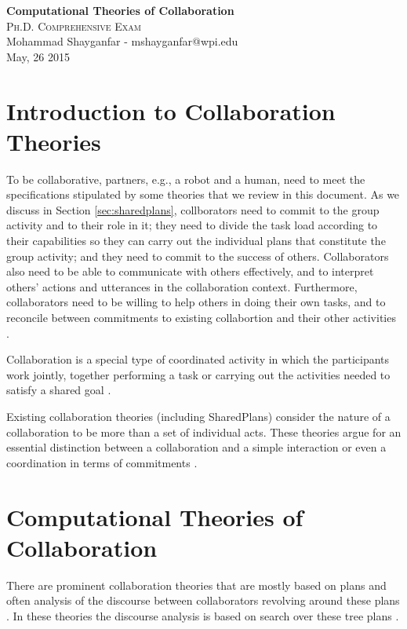 \documentclass[11pt]{article}
\begin{document}

\begin{center}
{\LARGE{\textbf{Computational Theories of Collaboration}}} \\
\Large\textsc{Ph.D. Comprehensive Exam} \\[1em]
\large\textnormal{Mohammad Shayganfar - mshayganfar@wpi.edu} \\
\large\textnormal{May, 26 2015}
\end{center}

\section{Introduction to Collaboration Theories}

To be collaborative, partners, e.g., a robot and a human, need to meet the
specifications stipulated by some theories that we review in this document. As
we discuss in Section \ref{sec:sharedplans}, collborators need to commit to the
group activity and to their role in it; they need to divide the task load
according to their capabilities so they can carry out the individual plans that
constitute the group activity; and they need to commit to the success of others.
Collaborators also need to be able to communicate with others effectively, and
to interpret others' actions and utterances in the collaboration context.
Furthermore, collaborators need to be willing to help others in doing their own
tasks, and to reconcile between commitments to existing collabortion and their
other activities \cite{grosz:mice-menus}.

Collaboration is a special type of coordinated activity in which the
participants work jointly, together performing a task or carrying out the
activities needed to satisfy a shared goal \cite{grosz:collaboration}.

Existing collaboration theories (including SharedPlans) consider the nature of a
collaboration to be more than a set of individual acts. These theories argue for
an essential distinction between a collaboration and a simple interaction or
even a coordination in terms of commitments \cite{grosz:shared-plans,
lochbaum:collaborative-planning}.

\section{Computational Theories of Collaboration}

There are prominent collaboration theories that are mostly based on plans and
often analysis of the discourse between collaborators revolving around these
plans \cite{grosz:plans-discourse, Litman:discourse-commonsense}. In these
theories the discourse analysis is based on search over these tree plans
\cite{rich:discourse}.
\end{document}
